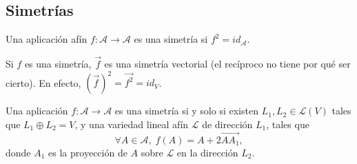 \subsection{Simetrías}
\begin{fdefinition}[Simetría]
\normalfont Una aplicación afín $\displaystyle f : \mathcal{A} \to \mathcal{A} $ es una simetría si $\displaystyle f^{2} = id _{\mathcal{A}} $.
\end{fdefinition}
\begin{observation}
\normalfont Si $\displaystyle f $ es una simetría, $\displaystyle \vec{f} $ es una simetría vectorial (el recíproco no tiene por qué ser cierto). En efecto, $\displaystyle \left(\vec{f}\right)^{2} = \vec{f^{2}} = id _{V} $. 
\end{observation}
\begin{ftheorem}[]
\normalfont Una aplicación $\displaystyle f : \mathcal{A} \to \mathcal{A} $ es una simetría si y solo si existen $\displaystyle L_{1}, L_{2} \in \mathcal{L}\left(V\right) $ tales que $\displaystyle L_{1} \oplus L_{2} = V $, y una variedad lineal afín $\displaystyle \mathcal{L} $ de dirección $\displaystyle L_{1} $, tales que 
\[ \forall A \in \mathcal{A}, \; f\left(A\right) = A + 2\overrightarrow{AA_{1}} ,\]
donde $\displaystyle A_{1} $ es la proyección de $\displaystyle A $ sobre $\displaystyle \mathcal{L} $ en la dirección $\displaystyle L_{2} $.
\end{ftheorem}
